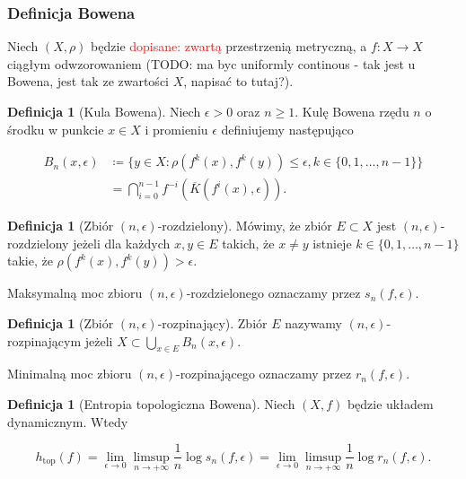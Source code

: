 \documentclass[licencjacka]{pwr_wmat_praca_dyplomowa}
\theoremstyle{plain}
\numberwithin{theorem}{chapter}
\theoremstyle{definition}
\numberwithin{theorem}{chapter}
\newtheorem{definition}[theorem]{Definicja}
\begin{document}
\subsubsection{Definicja Bowena}
\cite{ruette2017chaos}

Niech $(X, \rho)$ będzie \textcolor{red}{ dopisane: zwartą} przestrzenią metryczną, a $f: X \rightarrow X$ ciągłym odwzorowaniem (TODO: ma byc uniformly continous - tak jest u Bowena, jest tak ze zwartości $X$, napisać to tutaj?).

\begin{definition}[Kula Bowena]
Niech  $\epsilon > 0$ oraz $n \geq 1$. Kulę Bowena rzędu $n$ o środku w punkcie $x \in X$ i promieniu $\epsilon$ definiujemy następująco

\begin{equation}
\begin{aligned}
B_n(x,\epsilon) & \coloneqq \{y \in X : \rho(f^k(x), f^k(y)) \leq \epsilon, k \in \{0, 1, \ldots, n-1\}\} \\
& = \bigcap_{i=0}^{n-1}f^{-i}(\overline{K}(f^i(x), \epsilon)).
\end{aligned}
\end{equation}

\end{definition} 


\begin{definition}[Zbiór $(n,\epsilon)$-rozdzielony]
Mówimy, że zbiór $E \subset X$ jest $(n, \epsilon)$-rozdzielony jeżeli dla każdych $x, y \in E$ takich, że $x \neq y$ istnieje $k \in \{0, 1, \ldots, n-1\}$ takie, że $\rho(f^k(x), f^k(y)) > \epsilon.$

Maksymalną moc zbioru $(n, \epsilon)$-rozdzielonego oznaczamy przez $s_n(f, \epsilon).$
\end{definition}


\begin{definition}[Zbiór $(n, \epsilon)$-rozpinający]
Zbiór $E$ nazywamy $(n,\epsilon)$-rozpinającym jeżeli $X \subset \bigcup_{x \in E}B_n(x, \epsilon)$.

Minimalną moc zbioru $(n, \epsilon)$-rozpinającego oznaczamy przez $r_n(f, \epsilon).$

\end{definition}


\begin{definition}[Entropia topologiczna Bowena]
Niech $(X, f)$ będzie układem dynamicznym.
Wtedy

$$h_{\textrm{top}}(f) = \lim_{\epsilon \rightarrow 0} \limsup_{n \rightarrow +\infty} \frac{1}{n} \log s_n(f, \epsilon) = \lim_{\epsilon \rightarrow 0} \limsup_{n \rightarrow +\infty} \frac{1}{n} \log r_n(f, \epsilon).$$

\end{definition}
\end{document}
